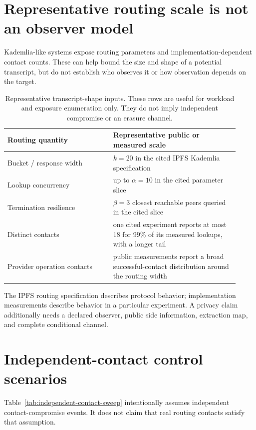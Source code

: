 \documentclass[11pt]{article}
\begin{document}
\section{Representative routing scale is not an observer model}\label{sec:routing}
Kademlia-like systems expose routing parameters and implementation-dependent contact counts. These can help bound the size and shape of a potential transcript, but do not establish who observes it or how observation depends on the target.

\begin{table}[H]
\centering
\begin{tabular}{@{}p{0.42\linewidth}p{0.50\linewidth}@{}}
\toprule
Routing quantity & Representative public or measured scale\\
\midrule
Bucket / response width & \(k=20\) in the cited IPFS Kademlia specification\\
Lookup concurrency & up to \(\alpha=10\) in the cited parameter slice\\
Termination resilience & \(\beta=3\) closest reachable peers queried in the cited slice\\
Distinct contacts & one cited experiment reports at most \(18\) for 99\% of its measured lookups, with a longer tail\\
Provider operation contacts & public measurements report a broad successful-contact distribution around the routing width\\
\bottomrule
\end{tabular}
\caption{Representative transcript-shape inputs. These rows are useful for workload and exposure enumeration only. They do not imply independent compromise or an erasure channel.}
\label{tab:routing-scale}
\end{table}

The IPFS routing specification describes protocol behavior; implementation measurements describe behavior in a particular experiment. A privacy claim additionally needs a declared observer, public side information, extraction map, and complete conditional channel.\cite{ipfs_kad_spec,cortes2024kadlimits,probelab_rfm17,trautwein2024ipfs}

\section{Independent-contact control scenarios}\label{sec:contactsweep}
Table~\ref{tab:independent-contact-sweep} intentionally assumes independent contact-compromise events. It does not claim that real routing contacts satisfy that assumption.
\end{document}
